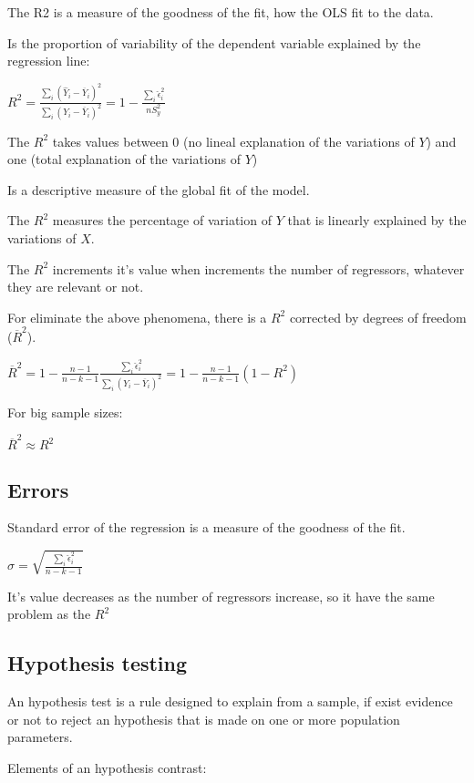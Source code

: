 \documentclass[10pt,landscape]{article}
\begin{document}
\begin{multicols}{3}
The R2 is a measure of the goodness of the fit, how the OLS fit to the data.

Is the proportion of variability of the dependent variable explained by the regression line:

$R^2 = \frac{\sum_i (\hat{Y}_i - \overline{Y}_i)^2}{\sum_i (Y_i - \overline{Y}_i)^2} = 1 - \frac{\sum_i \hat{\epsilon}_i^2}{nS_y^2}$

The $R^2$ takes values between 0 (no lineal explanation of the variations of $Y$) and one (total explanation of the variations of $Y$)

Is a descriptive measure of the global fit of the model.

The $R^2$ measures the percentage of variation of $Y$ that is linearly explained by the variations of $X$.

The $R^2$ increments it's value when increments the number of regressors, whatever they are relevant or not.

For eliminate the above phenomena, there is a $R^2$ corrected by degrees of freedom ($\overline{R}^2$).

$\overline{R}^2 = 1 - \frac{n-1}{n-k-1} \frac{\sum_i \hat{\epsilon}_i^2}{\sum_i (Y_i - \overline{Y}_i)^2} = 1 - \frac{n-1}{n-k-1} (1-R^2)$

For big sample sizes:

$\overline{R}^2 \approx R^2$

\subsection*{Errors}

Standard error of the regression is a measure of the goodness of the fit.

$\hat{\sigma} = \sqrt{\frac{\sum_i \hat{\epsilon}_i^2}{n-k-1}}$

It's value decreases as the number of regressors increase, so it have the same problem as the $R^2$

\subsection*{Hypothesis testing}

An hypothesis test is a rule designed to explain from a sample, if exist evidence or not to reject an hypothesis that is made on one or more population parameters.

Elements of an hypothesis contrast:


\end{multicols}
\end{document}

